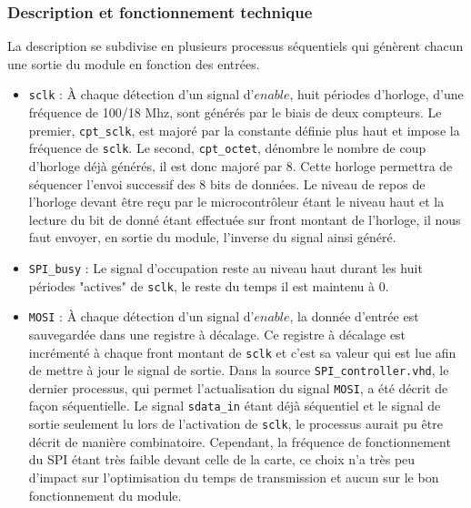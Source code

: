 \documentclass[11pt]{article}
\begin{document}
\subsubsection{Description et fonctionnement technique}

La description se subdivise en plusieurs processus séquentiels qui génèrent chacun une sortie du module en fonction des entrées. 

\begin{itemize} 

\item[\textbullet] \texttt{sclk} : À chaque détection d'un signal d'$enable$, huit périodes d'horloge, d'une fréquence de 100/18 Mhz, sont générés par le biais de deux compteurs. Le premier, \texttt{cpt\_sclk}, est majoré par la constante définie plus haut et impose la fréquence de \texttt{sclk}. Le second, \texttt{cpt\_octet}, dénombre le nombre de coup d'horloge déjà générés, il est donc majoré par 8. Cette horloge permettra de séquencer l'envoi successif des 8 bits de données. Le niveau de repos de l'horloge devant être reçu par le microcontrôleur étant le niveau haut et la lecture du bit de donné étant effectuée sur front montant de l'horloge, il nous faut envoyer, en sortie du module, l'inverse du signal ainsi généré.

\item[\textbullet] \texttt{SPI\_busy} : Le signal d'occupation reste au niveau haut durant les huit périodes "actives" de \texttt{sclk}, le reste du temps il est maintenu à 0.

\newpage

\item[\textbullet] \texttt{MOSI} : À chaque détection d'un signal d'$enable$, la donnée d'entrée est sauvegardée dans une registre à décalage. Ce registre à décalage est incrémenté à chaque front montant de \texttt{sclk} et c'est sa valeur qui est lue afin de mettre à jour le signal de sortie. Dans la source \texttt{SPI\_controller.vhd}, le dernier processus, qui permet l'actualisation du signal \texttt{MOSI}, a été décrit de façon séquentielle. Le signal \texttt{sdata\_in} étant déjà séquentiel et le signal de sortie seulement lu lors de l'activation de \texttt{sclk}, le processus aurait pu être décrit de manière combinatoire. Cependant, la fréquence de fonctionnement du SPI étant très faible devant celle de la carte, ce choix n'a très peu d'impact sur l'optimisation du temps de transmission et aucun sur le bon fonctionnement du module.

\end{itemize}
\end{document}
